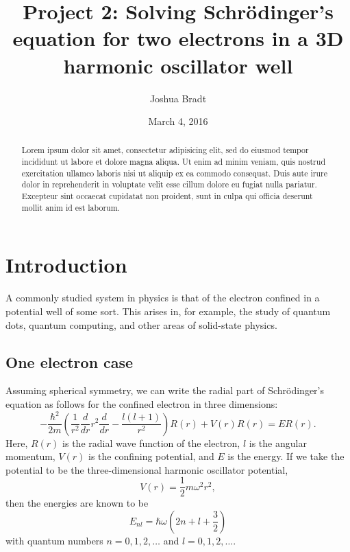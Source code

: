 \documentclass[aps,prc,reprint,nobalancelastpage]{revtex4-1}
\begin{document}
\title{Project 2: Solving Schr\"odinger's equation for two electrons in a 3D harmonic oscillator well}
\author{Joshua Bradt}
\noaffiliation
\date{March 4, 2016}

\begin{abstract}
    Lorem ipsum dolor sit amet, consectetur adipisicing elit, sed do eiusmod tempor incididunt ut labore et dolore magna aliqua. Ut enim ad minim veniam, quis nostrud exercitation ullamco laboris nisi ut aliquip ex ea commodo consequat. Duis aute irure dolor in reprehenderit in voluptate velit esse cillum dolore eu fugiat nulla pariatur. Excepteur sint occaecat cupidatat non proident, sunt in culpa qui officia deserunt mollit anim id est laborum.
\end{abstract}

\maketitle

\section{Introduction}
\label{sec:introduction}
    A commonly studied system in physics is that of the electron confined in a potential well of some sort. This arises in, for example, the study of quantum dots, quantum computing, and other areas of solid-state physics.

    \subsection{One electron case}
    \label{sub:oneelec}
        Assuming spherical symmetry, we can write the radial part of Schr\"odinger's equation as follows for the confined electron in three dimensions:
        \begin{equation}
            -\frac{\hbar^2}{2m} \left( \frac{1}{r^2} \frac{d}{dr} r^2 \frac{d}{dr} - \frac{l(l+1)}{r^2} \right) R(r) + V(r)R(r) = ER(r).  \label{eq:genschro}
        \end{equation}
        Here, $R(r)$ is the radial wave function of the electron, $l$ is the angular momentum, $V(r)$ is the confining potential, and $E$ is the energy. If we take the potential to be the three-dimensional harmonic oscillator potential,
        \begin{equation}
            V(r) = \frac{1}{2} m \omega^2 r^2,
        \end{equation}
        then the energies are known to be
        \begin{equation}
            E_{nl} = \hbar\omega \left( 2n + l + \frac{3}{2} \right)
        \end{equation}
        with quantum numbers $n=0,1,2,\dots$ and $l=0,1,2,\dots$.
\end{document}
